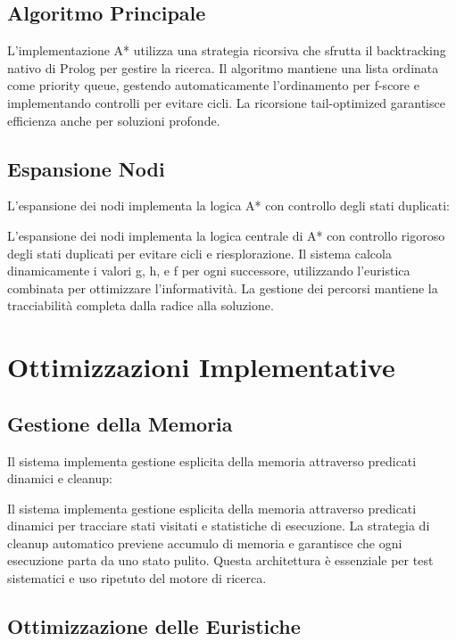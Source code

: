 \documentclass[12pt,a4paper]{report}
\theoremstyle{definition}
\begin{document}
\subsection{Algoritmo Principale}

L'implementazione A* utilizza una strategia ricorsiva che sfrutta il backtracking nativo di Prolog per gestire la ricerca. Il algoritmo mantiene una lista ordinata come priority queue, gestendo automaticamente l'ordinamento per f-score e implementando controlli per evitare cicli. La ricorsione tail-optimized garantisce efficienza anche per soluzioni profonde.

\subsection{Espansione Nodi}

L'espansione dei nodi implementa la logica A* con controllo degli stati duplicati:

L'espansione dei nodi implementa la logica centrale di A* con controllo rigoroso degli stati duplicati per evitare cicli e riesplorazione. Il sistema calcola dinamicamente i valori g, h, e f per ogni successore, utilizzando l'euristica combinata per ottimizzare l'informatività. La gestione dei percorsi mantiene la tracciabilità completa dalla radice alla soluzione.

\section{Ottimizzazioni Implementative}

\subsection{Gestione della Memoria}

Il sistema implementa gestione esplicita della memoria attraverso predicati dinamici e cleanup:

Il sistema implementa gestione esplicita della memoria attraverso predicati dinamici per tracciare stati visitati e statistiche di esecuzione. La strategia di cleanup automatico previene accumulo di memoria e garantisce che ogni esecuzione parta da uno stato pulito. Questa architettura è essenziale per test sistematici e uso ripetuto del motore di ricerca.

\subsection{Ottimizzazione delle Euristiche}
\end{document}
